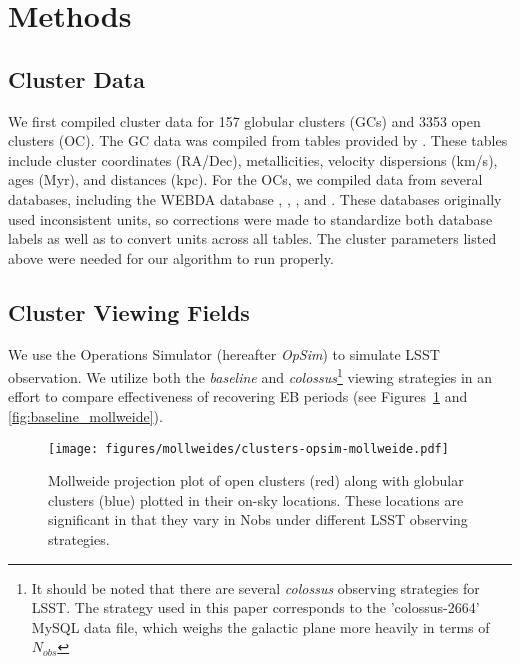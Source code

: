 \documentclass[twocolumn]{aastex63}
\begin{document}

\section{Methods} \label{sec:Methods}

\subsection{Cluster Data} \label{sec:compiling}

We first compiled cluster data for 157 globular clusters (GCs) and 3353 open clusters (OC). The GC data was compiled from tables provided by \citet{1996AJ....112.1487H}. These tables include cluster coordinates (RA/Dec), metallicities, velocity dispersions (km/s), ages (Myr), and distances (kpc). For the OCs, we compiled data from several databases, including the WEBDA database \citet{1995MNRAS.275..828M}, \citet{2013A&A...558A..53K}, \citet{2004A&A...414..163S}, and \citet{2008A&A...477..165P}. These databases originally used inconsistent units, so corrections were made to standardize both database labels as well as to convert units across all tables. The cluster parameters listed above were needed for our algorithm to run properly.

\subsection{Cluster Viewing Fields} \label{sec:overlap}
We use the Operations Simulator (hereafter \textit{OpSim}) to simulate LSST observation. We utilize both the \textit{baseline} and \textit{colossus}\footnote{It should be noted that there are several \textit{colossus} observing strategies for LSST. The strategy used in this paper corresponds to the 'colossus-2664' MySQL data file, which weighs the galactic plane more heavily in terms of $N_{obs}$} viewing strategies in an effort to compare effectiveness of recovering EB periods (see Figures~\ref{fig:cluster_mollweide} and \ref{fig:baseline_mollweide}). 

\begin{figure}
    \centering
    \texttt{[image: figures/mollweides/clusters-opsim-mollweide.pdf]}
    \caption{Mollweide projection plot of open clusters (red) along with globular clusters (blue) plotted in their on-sky locations. These locations are significant in that they vary in Nobs under different LSST observing strategies.}
    \label{fig:cluster_mollweide}
\end{figure}
\end{document}
